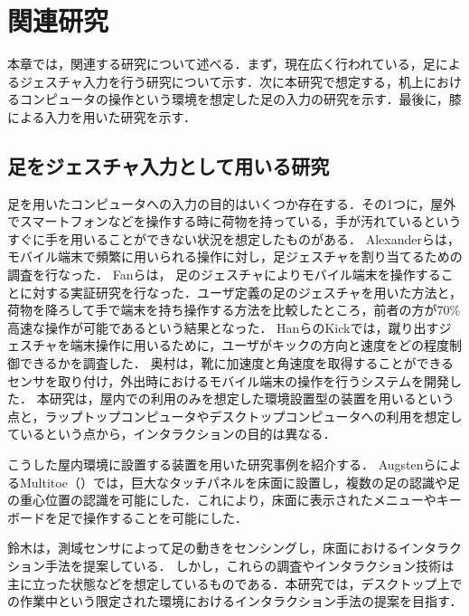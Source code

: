\chapter{関連研究}
本章では，関連する研究について述べる．まず，現在広く行われている，足によるジェスチャ入力を行う研究について示す．次に本研究で想定する，机上におけるコンピュータの操作という環境を想定した足の入力の研究を示す．最後に，膝による入力を用いた研究を示す．
\section{足をジェスチャ入力として用いる研究}

足を用いたコンピュータへの入力の目的はいくつか存在する．その1つに，屋外でスマートフォンなどを操作する時に荷物を持っている，手が汚れているというすぐに手を用いることができない状況を想定したものがある．
Alexanderら\cite{Alexander:2012:PYB:2207676.2208575}は，モバイル端末で頻繁に用いられる操作に対し，足ジェスチャを割り当てるための調査を行なった．	
Fanら\cite{Fan:2017:ESF:3123021.3123043}は，
足のジェスチャによりモバイル端末を操作することに対する実証研究を行なった．ユーザ定義の足のジェスチャを用いた方法と，荷物を降ろして手で端末を持ち操作する方法を比較したところ，前者の方が70\%高速な操作が可能であるという結果となった．
HanらのKick\cite{Han:2011:KIU:2037373.2037379}では，蹴り出すジェスチャを端末操作に用いるために，ユーザがキックの方向と速度をどの程度制御できるかを調査した．
奥村\cite{okumura_2011}は，靴に加速度と角速度を取得することができるセンサを取り付け，外出時におけるモバイル端末の操作を行うシステムを開発した．
本研究は，屋内での利用のみを想定した環境設置型の装置を用いるという点と，ラップトップコンピュータやデスクトップコンピュータへの利用を想定しているという点から，インタラクションの目的は異なる．

こうした屋内環境に設置する装置を用いた研究事例を紹介する．
AugstenらによるMultitoe\cite{Augsten:2010:MHI:1866029.1866064}（）では，巨大なタッチパネルを床面に設置し，複数の足の認識や足の重心位置の認識を可能にした．これにより，床面に表示されたメニューやキーボードを足で操作することを可能にした．

鈴木\cite{ssuzuki_2009}は，測域センサによって足の動きをセンシングし，床面におけるインタラクション手法を提案している．
しかし，これらの調査やインタラクション技術は主に立った状態などを想定しているものである．本研究では，デスクトップ上での作業中という限定された環境におけるインタラクション手法の提案を目指す．


